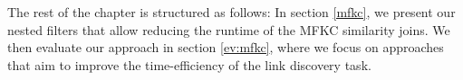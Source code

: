 The rest of the chapter is structured as follows: 
In section \ref{mfkc}, we present our nested filters that allow reducing the runtime of the MFKC similarity joins. We then evaluate our approach in section \ref{ev:mfkc}, where we focus on approaches that aim to improve the time-efficiency of the link discovery task. 





